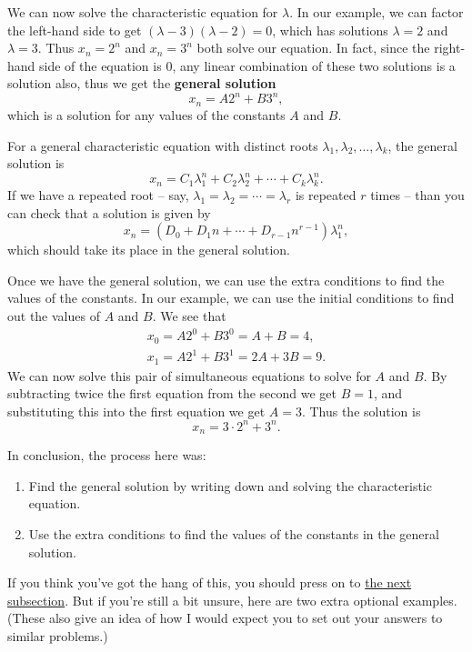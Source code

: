 \documentclass[
  a4paper,
]{article}
\providecommand{\tightlist}{%
  \setlength{\itemsep}{0pt}\setlength{\parskip}{0pt}}
\theoremstyle{definition}
\theoremstyle{definition}
\theoremstyle{definition}
\theoremstyle{remark}
\begin{document}
We can now solve the characteristic equation for \(\lambda\). In our example, we can factor the left-hand side to get \((\lambda - 3)(\lambda - 2) = 0\), which has solutions \(\lambda = 2\) and \(\lambda = 3\). Thus \(x_n = 2^n\) and \(x_n = 3^n\) both solve our equation. In fact, since the right-hand side of the equation is \(0\), any linear combination of these two solutions is a solution also, thus we get the \textbf{general solution}
\[ x_n = A 2^n + B 3^n , \]
which is a solution for any values of the constants \(A\) and \(B\).

For a general characteristic equation with distinct roots \(\lambda_1, \lambda_2, \dots, \lambda_k\), the general solution is
\[ x_n = C_1 \lambda_1^n + C_2 \lambda_2^n + \cdots + C_k \lambda_k^n . \]
If we have a repeated root -- say, \(\lambda_1 = \lambda_2 = \cdots = \lambda_r\) is repeated \(r\) times -- than you can check that a solution is given by
\[ x_n = (D_0 + D_1 n + \cdots + D_{r-1} n^{r-1}) \lambda_1^n , \]
which should take its place in the general solution.

Once we have the general solution, we can use the extra conditions to find the values of the constants. In our example, we can use the initial conditions to find out the values of \(A\) and \(B\). We see that
\begin{gather*}
x_0 = A2^0 + B3^0 = A + B = 4 , \\
x_1 = A2^1 + B3^1 = 2A + 3B = 9 .
\end{gather*}
We can now solve this pair of simultaneous equations to solve for \(A\) and \(B\). By subtracting twice the first equation from the second we get \(B = 1\), and substituting this into the first equation we get \(A = 3\). Thus the solution is
\[ x_n = 3\cdot 2^n + 3^n . \]

In conclusion, the process here was:

\begin{enumerate}
\def\labelenumi{\arabic{enumi}.}
\tightlist
\item
  Find the general solution by writing down and solving the characteristic equation.
\item
  Use the extra conditions to find the values of the constants in the general solution.
\end{enumerate}

If you think you've got the hang of this, you should press on to \protect\hyperlink{S04-ruin-probability}{the next subsection}. But if you're still a bit unsure, here are two extra optional examples. (These also give an idea of how I would expect you to set out your answers to similar problems.)
\end{document}
